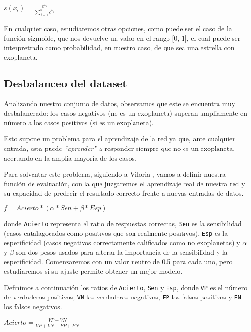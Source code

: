 \begin{math}
s(x_{i})=\frac{e^{x_{i}}}{\sum_{j=1}^{n}e^{x_j}}
\end{math}

En cualquier caso, estudiaremos otras opciones, como puede ser el caso
de la función sigmoide, que nos devuelve un valor en el rango {[}0,
1{]}, el cual puede ser interpretrado como probabilidad, en nuestro
caso, de que sea una estrella con exoplaneta.

\subsection{Desbalanceo del dataset}\label{desbalanceo-del-dataset}

Analizando nuestro conjunto de datos, observamos que este se encuentra
muy desbalanceado: los casos negativos (no es un exoplaneta) superan
ampliamente en número a los casos positivos (si es un exoplaneta).

Esto supone un problema para el aprendizaje de la red ya que, ante
cualquier entrada, esta puede \emph{``aprender''} a responder siempre
que no es un exoplaneta, acertando en la amplia mayoría de los casos.

Para solventar este problema, siguiendo a Viloria \cite{Viloria-2006}, vamos a
definir nuestra función de evaluación, con la que juzgaremos el
aprendizaje real de nuestra red y su capacidad de predecir el resultado
correcto frente a nuevas entradas de datos.

\begin{math}
f = Acierto * (\alpha * Sen + \beta * Esp)
\end{math}

donde \texttt{Acierto} representa el ratio de respuestas correctas,
\texttt{Sen} es la sensibilidad (casos catalagocados como positivos
que son realmente positivos), \texttt{Esp} es la especificidad
(casos negativos correctamente calificados como no exoplanetas) y
\(\alpha\) y \(\beta\) son dos pesos usados para alterar la importancia de la sensibilidad y la
especificidad. Comenzaremos con un valor neutro de 0.5 para cada uno,
pero estudiaremos si su ajuste permite obtener un mejor modelo.

Definimos a continuación los ratios de \texttt{Acierto},
\texttt{Sen} y \texttt{Esp}, donde \texttt{VP} es el número
de verdaderos positivos, \texttt{VN} los verdaderos negativos,
\texttt{FP} los falsos positivos y \texttt{FN} los falsos
negativos.

\begin{math}
Acierto = \frac{VP + VN}{VP + VN + FP + FN}
\end{math}

